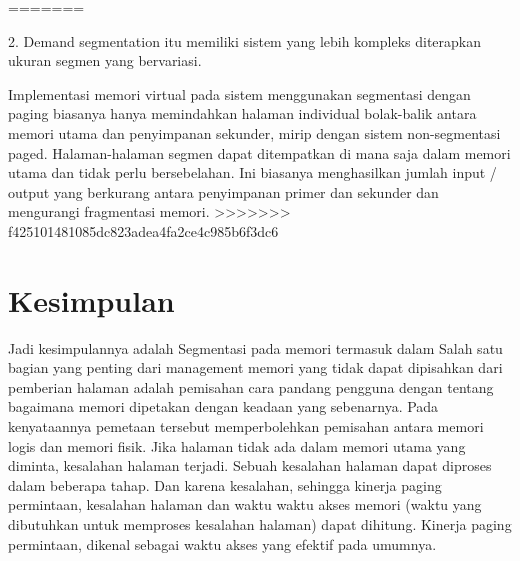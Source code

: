 =======
	
2. Demand segmentation itu memiliki sistem yang lebih kompleks diterapkan ukuran segmen yang bervariasi.

Implementasi memori virtual pada sistem menggunakan segmentasi dengan paging biasanya hanya memindahkan halaman individual bolak-balik antara memori utama dan penyimpanan sekunder, mirip dengan sistem non-segmentasi paged. Halaman-halaman segmen dapat ditempatkan di mana saja dalam memori utama dan tidak perlu bersebelahan. Ini biasanya menghasilkan jumlah input / output yang berkurang antara penyimpanan primer dan sekunder dan mengurangi fragmentasi memori.
>>>>>>> f425101481085dc823adea4fa2ce4c985b6f3dc6

\section {Kesimpulan}

Jadi kesimpulannya adalah Segmentasi pada memori termasuk dalam Salah satu bagian yang penting dari management memori yang tidak dapat dipisahkan dari pemberian halaman adalah pemisahan cara pandang pengguna dengan tentang bagaimana memori dipetakan dengan keadaan yang sebenarnya. Pada kenyataannya pemetaan tersebut memperbolehkan pemisahan antara memori logis dan memori fisik.
Jika halaman tidak ada dalam memori utama yang diminta, kesalahan halaman terjadi. Sebuah kesalahan halaman dapat diproses dalam beberapa tahap. Dan karena kesalahan, sehingga kinerja paging permintaan, kesalahan halaman dan waktu waktu akses memori (waktu yang dibutuhkan untuk memproses kesalahan halaman) dapat dihitung. Kinerja paging permintaan, dikenal sebagai waktu akses yang efektif pada umumnya.